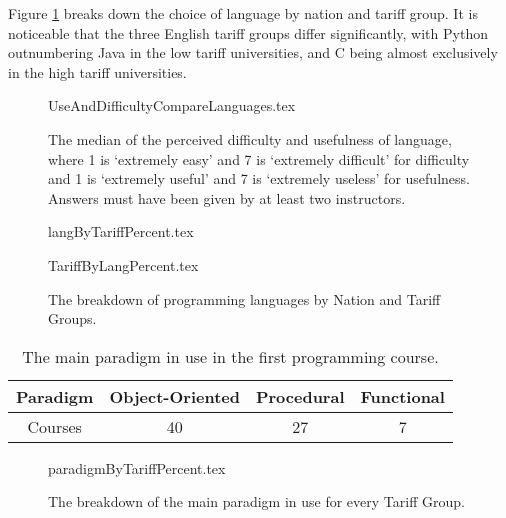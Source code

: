 \documentclass{sig-alternate}
\begin{document}
Figure \ref{fig;LangTariff} breaks down the choice of language by nation and tariff group.  It is noticeable that the three English tariff groups differ significantly, with Python outnumbering Java in the low tariff universities, and C being almost exclusively in the high tariff universities.

\begin{figure}
\begin{center}
{UseAndDifficultyCompareLanguages.tex}
\end{center}
\caption{The median of the perceived difficulty and usefulness of language, where 1 is `extremely easy' and 7 is `extremely difficult' for difficulty and 1 is `extremely useful' and 7 is `extremely useless' for usefulness.  Answers must have been given by at least two instructors.}
\end{figure}

\begin{figure}
\begin{center}
{langByTariffPercent.tex}
\end{center}
%
\begin{center}
{TariffByLangPercent.tex}
\end{center}
\caption{The breakdown of programming languages by Nation and Tariff Groups.\label{fig;LangTariff}}
\end{figure}


\begin{table}[]
\centering
\caption{The main paradigm in use in the first programming course.}
\label{tab:paradigm}
\begin{tabular}{cccc}
\hline
Paradigm & Object-Oriented & Procedural & Functional \\ \hline
Courses  & 40              & 27         & 7          \\ \hline
\end{tabular}
\end{table}

\clearpage

\begin{figure}
\begin{center}
{paradigmByTariffPercent.tex}
\end{center}
\caption{The breakdown of the main paradigm in use for every Tariff Group.}
\end{figure}
\end{document}
